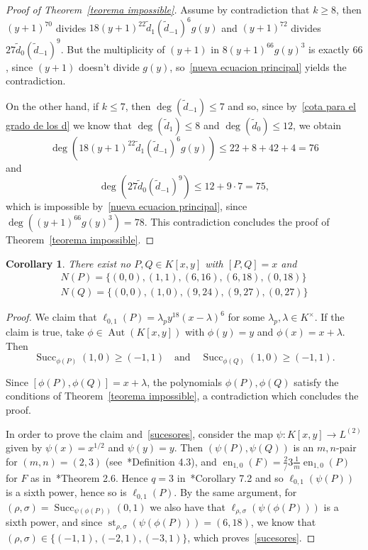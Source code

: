 \documentclass[reqno,a4paper,twoside]{amsart}
\newtheorem{corollary}[theorem]{Corollary}
\theoremstyle{definition}
\theoremstyle{remark}
\DeclareMathOperator{\Aut}{Aut}
\DeclareMathOperator{\en}{en}
\DeclareMathOperator{\st}{st}
\DeclareMathOperator{\Succ}{Succ}
\begin{document}
\begin{proof}[Proof of Theorem~\ref{teorema impossible}]
Assume by contradiction that
$k\ge 8$, then $(y+1)^{70}$ divides $18 (y+1)^{22}\tilde d_1 (\tilde d_{-1})^6 g(y)$ and
$(y+1)^{72}$ divides $27 \tilde d_0 (\tilde d_{-1})^9$. But the multiplicity of $(y+1)$ in  $8 (y+1)^{66}g(y)^3$
is exactly $66$, since $(y+1)$ doesn't divide $g(y)$, so~\eqref{nueva ecuacion principal} yields the contradiction.

On the other hand, if $k\le 7$, then $\deg(\tilde d_{-1})\le 7$ and so, since by~\eqref{cota para el grado de los d} we know that $\deg(\tilde d_1)\le 8$ and
$\deg(\tilde d_0)\le 12$, we obtain
$$
\deg(18 (y+1)^{22}\tilde d_1 (\tilde d_{-1})^6 g(y))\le 22+8+42+4=76
$$
and
$$
\deg(27 \tilde d_0 (\tilde d_{-1})^9)\le 12+9\cdot 7=75,
$$
which is impossible by~\eqref{nueva ecuacion principal}, since $\deg((y+1)^{66}g(y)^3)=78$. This contradiction concludes the proof of Theorem~\ref{teorema impossible}.
\end{proof}

\begin{corollary}
There exist no $P,Q \in K[x,y]$ with $[P,Q] = x$ and
	\begin{align*}
	N(P) = \{(0,0),(1,1),(6,16), (6,18), (0,18)\} \\
	N(Q) = \{(0,0),(1,0),(9,24), (9,27), (0,27)\}
	\end{align*}
\end{corollary}

\begin{proof}
We claim that $\ell_{0,1}(P)=\lambda_p y^18 (x-\lambda)^6$ for some $\lambda_p,\lambda\in K^{\times}$.
If the claim is true, take $\phi\in \Aut(K[x,y])$ with $\phi(y)=y$ and $\phi(x)=x+\lambda$. Then
\begin{equation}\label{sucesores}
\Succ_{\phi(P)}(1,0)\ge (-1,1)\quad\text{and}\quad \Succ_{\phi(Q)}(1,0)\ge (-1,1).
\end{equation}

Since $[\phi(P),\phi(Q)]=x+\lambda$, the polynomials $\phi(P),\phi(Q)$ satisfy the conditions of Theorem~\ref{teorema impossible},
a contradiction which concludes the proof.

In order to prove the claim and~\eqref{sucesores}, consider the map $\psi:K[x,y]\to L^{(2)}$ given by
$\psi(x)=x^{1/2}$ and $\psi(y)=y$. Then $(\psi(P),\psi(Q))$ is an $m,n$-pair for $(m,n)=(2,3)$ (see~\cite{GGV1}*{Definition 4.3}), and
$\en_{1,0}(F)=\frac 2/3 \frac {1}{m}\en_{1,0}(P)$ for $F$ as in~\cite{GGV1}*{Theorem 2.6}. Hence $q=3$ in~\cite{GGV1}*{Corollary 7.2}
and so $\ell_{0,1}(\psi(P))$ is a sixth power, hence so is $\ell_{0,1}(P)$. By the same argument, for $(\rho,\sigma)=\Succ_{\psi(\phi(P))}(0,1)$ we also have
that $\ell_{\rho,\sigma}(\psi(\phi(P)))$ is a sixth power, and since $\st_{\rho,\sigma}(\psi(\phi(P)))=(6,18)$, we know that $(\rho,\sigma)\in\{(-1,1),(-2,1),(-3,1)\}$,
which proves~\eqref{sucesores}.
\end{proof}
\end{document}
